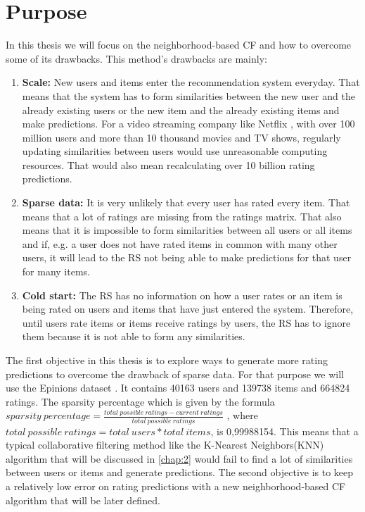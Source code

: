 \section{Purpose}
In this thesis we will focus on the neighborhood-based CF and how to overcome some
of its drawbacks. This method's drawbacks are mainly:
\begin{enumerate}
    \item \textbf{Scale:} New users and items enter the recommendation system everyday.
    That means that the system has to form similarities between the new user and the
    already existing users or the new item and the already existing items and make
    predictions. For a video streaming company like Netflix \citep{netflix}, with over
    100 million users and more than 10 thousand movies and TV shows, regularly updating
    similarities between users would use unreasonable computing resources. That
    would also mean recalculating over 10 billion rating predictions.
    \item \textbf{Sparse data:} It is very unlikely that every user has rated
    every item. That means that a lot of ratings are missing from the ratings matrix.
    That also means that it is impossible to form similarities between all users
    or all items and if, e.g. a user does not have rated items in common with many
    other users, it will lead to the RS not being able to make predictions for
    that user for many items.
    \item \textbf{Cold start:} The RS has no information on how a user rates or
    an item is being rated on users and items that have just entered the system. Therefore,
    until users rate items or items receive ratings by users, the RS has to
    ignore them because it is not able to form any similarities.
\end{enumerate}
The first objective in this thesis is to explore ways to generate more rating
predictions to overcome the drawback of sparse data. For that purpose we will use the
Epinions dataset \citep{Massa}. It contains 40163 users and 139738 items and
664824 ratings. The sparsity percentage which is given by the formula
$sparsity\ percentage = \frac{total\ possible\ ratings - current\ ratings}{total\ possible\ ratings}$
, where\\$total\ possible\ ratings = total\ users*total\ items$, is 0,99988154. This means that a
typical collaborative filtering method like the K-Nearest Neighbors(KNN) algorithm
\citep{schafer2007collaborative} that will be discussed in \autoref{chap:2}
would fail to find a lot of similarities between users or items and generate
predictions. The second objective is to keep a relatively low error on
rating predictions with a new neighborhood-based CF algorithm that will be later defined.

